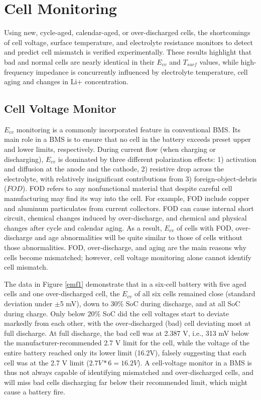 \chapter{Cell Monitoring}

\hspace{0.5cm} 
Using new, cycle-aged, calendar-aged, or over-discharged cells, the shortcomings of cell voltage, surface temperature, and electrolyte resistance monitors to detect and predict cell mismatch is verified experimentally. These results highlight that bad and normal cells are nearly identical in their $E_{cv}$ and $T_{surf}$ values, while high-frequency impedance is concurrently influenced by electrolyte temperature, cell aging and changes in Li+ concentration. 

\section{Cell Voltage Monitor}

\hspace{0.5cm}
$E_{cv}$ monitoring is a commonly incorporated feature in conventional BMS. Its main role in a BMS is to ensure that no cell in the battery exceeds preset upper and lower limits, respectively. During current flow (when charging or discharging), $E_{cv}$ is dominated by three different polarization effects: 1) activation and diffusion at the anode and the cathode, 2) resistive drop across the electrolyte, with relatively insignificant contributions from 3) foreign-object-debris ($FOD$). FOD refers to any nonfunctional material that despite careful cell manufacturing may find its way into the cell. For example, FOD include copper and aluminum particulates from current collectors. FOD can cause internal short circuit, chemical changes induced by over-discharge, and chemical and physical changes after cycle and calendar aging. As a result, $E_{cv}$ of cells with FOD, over-discharge and age abnormalities will be quite similar to those of cells without those abnormalities. FOD, over-discharge, and aging are the main reasons why cells become mismatched; however, cell voltage monitoring alone cannot identify cell mismatch.

\vspace{0.5cm}
The data in Figure \ref{emf1} demonstrate that in a six-cell battery with five aged cells and one over-discharged cell, the $E_{cv}$ of all six cells remained close (standard deviation under $\pm$5 mV), down to 30\% SoC during discharge, and at all SoC during charge. Only below 20\% SoC did the cell voltages start to deviate markedly from each other, with the over-discharged (bad) cell deviating most at full discharge. At full discharge, the bad cell was at 2.387 V, i.e., 313 mV below the manufacturer-recommended 2.7 V limit for the cell, while the voltage of the entire battery reached only its lower limit (16.2V), falsely suggesting that each cell was at the 2.7 V limit ($2.7V\ast6=16.2V$). A cell-voltage monitor in a BMS is thus not always capable of identifying mismatched and over-discharged cells, and will miss bad cells discharging far below their recommended limit, which might cause a battery fire.

